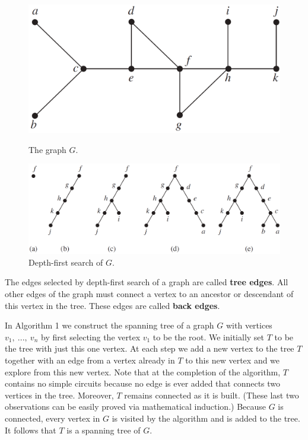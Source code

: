 \documentclass{article}
\begin{document}
\begin{figure}[h!]
\begin{minipage}[c]{0.40\textwidth}
    \centering
    \includegraphics[width=\textwidth]{img/ch11.4-figure6.png}
    \caption{The graph $G$.}
\end{minipage}\hfill
\begin{minipage}[c]{0.55\textwidth}
    \centering
    \includegraphics[width=\textwidth]{img/ch11.4-figure7.png}
    \caption{Depth-first search of $G$.}
\end{minipage}\hfill
\end{figure}

The edges selected by depth-first search of a graph are called \textbf{tree edges}. All other edges of the graph must connect a vertex to an ancestor or descendant of this vertex in the tree. These edges are called \textbf{back edges}.

In Algorithm 1 we construct the spanning tree of a graph $G$ with vertices $v_1,\ ...,\ v_n$ by first selecting the vertex $v_1$ to be the root. We initially set $T$ to be the tree with just this one vertex. At each step we add a new vertex to the tree $T$ together with an edge from a vertex already in $T$ to this new vertex and we explore from this new vertex. Note that at the completion of the algorithm, $T$ contains no simple circuits because no edge is ever added that connects two vertices in the tree. Moreover, $T$ remains connected as it is built. (These last two observations can be easily proved via mathematical induction.) Because $G$ is connected, every vertex in $G$ is visited by the algorithm and is added to the tree. It follows that $T$ is a spanning tree of $G$.
\end{document}
